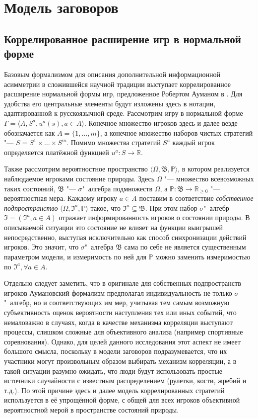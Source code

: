 \chapter{Модель заговоров}\label{ch:ch1}

\section{Коррелированное расширение игр в нормальной форме}\label{sec:ch1/sec1}

Базовым формализмом для описания дополнительной информационной асимметрии в сложившейся научной традиции выступает коррелированное расширение нормальной формы игр, предложенное Робертом Ауманом в \cite{Aumann74}. Для удобства его центральные элементы будут изложены здесь в нотации, адаптированной к русскоязычной среде. Рассмотрим игру в нормальной форме $\Gamma = \langle A, S^a, u^a(s), a \in A \rangle$. Конечное множество игроков здесь и далее везде обозначается как $A = \{1, \ldots, m\}$, а конечное множество наборов чистых стратегий "--- $S = S^1 \times \ldots \times S^m$. Помимо множества стратегий $S^a$ каждый игрок определяется платёжной функцией $u^a : S \rightarrow \mathbb{R}$.

Также рассмотрим вероятностное пространство\cite{Kolmogorov} $\langle \Omega, \mathfrak{B}, \mathbb{P} \rangle$, в котором реализуется наблюдаемое игроками состояние природы. Здесь $\Omega$ "--- множество всевозможных таких состояний, $\mathfrak{B}$ "--- $\sigma$"~алгебра подмножеств $\Omega$, а $\mathbb{P} : \mathfrak{B} \rightarrow \mathbb{R}_{\ge 0}$ "--- вероятностная мера. Каждому игроку $a \in A$ поставим в соответствие \emph{собственное подпространство} $\langle \Omega, \mathfrak{I}^a, \mathbb{P} \rangle$ такое, что $\mathfrak{I}^a \subseteq \mathfrak{B}$. При этом набор $\sigma$"~алгебр $\mathfrak{I} = (\mathfrak{I}^a, a \in A)$ отражает информированность игроков о состоянии природы. В описываемой ситуации это состояние не влияет на функции выигрышей непосредственно, выступая исключительно как способ синхронизации действий игроков. Это значит, что $\sigma$"~алгебра $\mathfrak{B}$ сама по себе не является существенным параметром модели, и измеримость по ней для $\mathbb{P}$ можно заменить измеримостью по $\mathfrak{I}^a, \forall a \in A$.

Отдельно следует заметить, что в оригинале для собственных подпространств игроков Аумановский формализм предполагал индивидуальность не только $\sigma$"~алгебр, но и соответствующих им мер, учитывая тем самым возможную субъективность оценок вероятности наступления тех или иных событий, что немаловажно в случаях, когда в качестве механизма корреляции выступают процессы, слишком сложные для объективного анализа (например спортивные соревнования). Однако, для целей данного исследования этот аспект не имеет большого смысла, поскольку в модели заговоров подразумевается, что их участники могут произвольным образом выбирать механизм корреляции, а в такой ситуации разумно ожидать, что люди будут использовать простые источники случайности с известным распределением (рулетки, кости, жребий и т.д.). По этой причине здесь и далее модель коррелированных стратегий используется в её упрощённой форме, с общей для всех игроков объективной вероятностной мерой в пространстве состояний природы.

